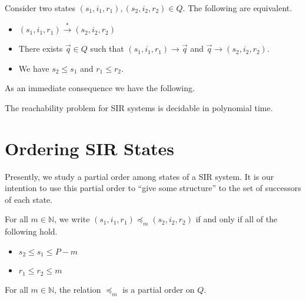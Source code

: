 \begin{claim}
    Consider two states $(s_1,i_1,r_1),(s_2,i_2,r_2) \in Q$. The following are equivalent.
    \begin{itemize}
        \item $(s_1,i_1,r_1) \xrightarrow{*} (s_2,i_2,r_2)$
        \item There exists $\vec{q} \in Q$ such that $(s_1,i_1,r_1) \rightarrow \vec{q}$ and $\vec{q} \rightarrow (s_2,i_2,r_2)$.
        \item We have $s_2 \leq s_1$ and $r_1 \leq r_2$.
    \end{itemize}
\end{claim}
As an immediate consequence we have the following.
\begin{claim}
    The reachability problem for SIR systems is decidable in polynomial time.
\end{claim}

\section{Ordering SIR States}
Presently, we study a partial order among states of a SIR system. It is our intention to use this partial order to ``give some structure'' to the set of successors of each state.

\begin{definition}
    For all $m \in \mathbb{N}$, we write $(s_1,i_1,r_1) \preceq_m (s_2,i_2,r_2)$ if and only if all of the following hold.
    \begin{itemize}
        \item $s_2 \leq s_1 \leq P - m$
        \item $r_1 \leq r_2 \leq m$
    \end{itemize}
\end{definition}

\begin{lemma}
    For all $m \in \mathbb{N}$, the relation ${} \preceq_m {}$ is a partial order on $Q$.
\end{lemma}

